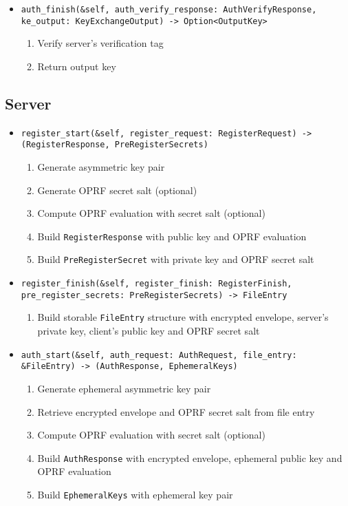 \documentclass[../report.tex]{subfiles}
\begin{document}
\begin{itemize}
 \item \verb|auth_finish(&self, auth_verify_response: AuthVerifyResponse, ke_output: KeyExchangeOutput) -> Option<OutputKey>|
  \begin{enumerate}
    \item Verify server's verification tag
    \item Return output key
  \end{enumerate}
  
\end{itemize}

\subsection{Server}
\begin{itemize}
 \item \verb|register_start(&self, register_request: RegisterRequest) -> (RegisterResponse, PreRegisterSecrets)|
  \begin{enumerate}
    \item Generate asymmetric key pair
    \item Generate OPRF secret salt (optional)
    \item Compute OPRF evaluation with secret salt (optional)
    \item Build \verb|RegisterResponse| with public key and OPRF evaluation
    \item Build \verb|PreRegisterSecret| with private key and OPRF secret salt
  \end{enumerate}
  
 \item \verb|register_finish(&self, register_finish: RegisterFinish, pre_register_secrets: PreRegisterSecrets) -> FileEntry|
  \begin{enumerate}
    \item Build storable \verb|FileEntry| structure with encrypted envelope, server's private key, client's public key and OPRF secret salt
  \end{enumerate}
  
  
  
 \item \verb|auth_start(&self, auth_request: AuthRequest, file_entry: &FileEntry) -> (AuthResponse, EphemeralKeys)|
  \begin{enumerate}
    \item Generate ephemeral asymmetric key pair
    \item Retrieve encrypted envelope and OPRF secret salt from file entry
    \item Compute OPRF evaluation with secret salt (optional)
    \item Build \verb|AuthResponse| with encrypted envelope, ephemeral public key and OPRF evaluation
    \item Build \verb|EphemeralKeys| with ephemeral key pair
  \end{enumerate}
  

\end{itemize}
\end{document}

